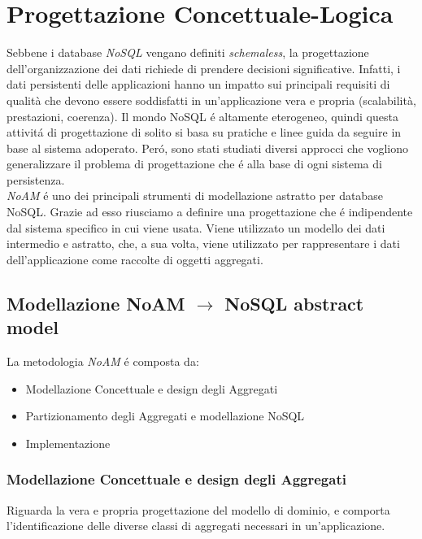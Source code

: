 \chapter{Progettazione Concettuale-Logica}
Sebbene i database \emph{NoSQL} vengano definiti \emph{schemaless}, la progettazione dell'organizzazione dei dati richiede
di prendere decisioni significative. Infatti, i dati persistenti delle applicazioni hanno un impatto sui principali requisiti
di qualità che devono essere soddisfatti in un'applicazione vera e propria (scalabilità, prestazioni, coerenza).
Il mondo NoSQL é altamente eterogeneo, quindi questa attivitá di progettazione di solito si basa su pratiche e linee guida da seguire
in base al sistema adoperato. Peró, sono stati studiati diversi approcci che vogliono generalizzare il problema di progettazione
che é alla base di ogni sistema di persistenza.\\
\emph{NoAM} é uno dei principali strumenti di modellazione astratto per database NoSQL. Grazie ad esso riusciamo a definire
una progettazione che é indipendente dal sistema specifico in cui viene usata. Viene utilizzato un modello dei dati intermedio e astratto,
che, a sua volta, viene utilizzato per rappresentare i dati dell'applicazione come raccolte di oggetti aggregati.
\section{Modellazione NoAM $\to$ NoSQL abstract model}
La metodologia \emph{NoAM} é composta da:
\begin{itemize}
    \item Modellazione Concettuale e design degli Aggregati
    \item Partizionamento degli Aggregati e modellazione NoSQL
    \item Implementazione
\end{itemize}

\subsection{Modellazione Concettuale e design degli Aggregati}
Riguarda la vera e propria progettazione del modello di dominio, e comporta l'identificazione
delle diverse classi di aggregati necessari in un'applicazione.

